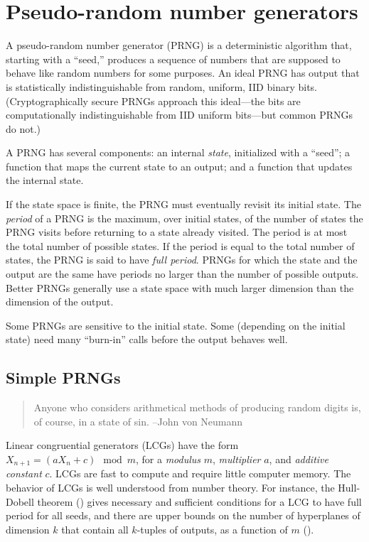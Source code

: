 \documentclass[graybox]{svmult}
\begin{document}
\section{Pseudo-random number generators}
\label{sec:prngs}

A pseudo-random number generator (PRNG) is a deterministic algorithm that, starting with
a ``seed,'' produces a sequence of numbers that are supposed to behave like random numbers
for some purposes.
An ideal PRNG has output that is statistically indistinguishable from random, uniform, IID 
binary bits. 
(Cryptographically secure PRNGs approach this ideal---the bits are computationally indistinguishable from IID uniform bits---but common PRNGs do not.)

A PRNG has several components:
an internal \emph{state}, initialized with a ``seed'';
a function that maps the current state to an output;
and a function that updates the internal state.

If the state space is finite, the PRNG must eventually revisit its initial state.
The \emph{period} of a PRNG is the maximum, over initial states, of the number of states 
the PRNG visits before returning to a state already visited.
The period is at most the total number of possible states.
If the period is equal to the total number of states, the PRNG is said to have \emph{full period}.
PRNGs for which the state and the output are the same have periods no larger than the number of possible outputs.
Better PRNGs generally use a state space with much larger dimension than the dimension of the output.

Some PRNGs are sensitive to the initial state.
Some (depending on the initial state) need many ``burn-in'' calls before the output 
behaves well.

\subsection{Simple PRNGs}

\begin{quotation}
Anyone who considers arithmetical methods of producing random digits is, of course, in a state of sin.  --John von Neumann
\end{quotation}


Linear congruential generators (LCGs) have the form $X_{n+1} = (a X_n + c) \mod m$, for a 
\emph{modulus} $m$, 
\emph{multiplier} $a$, and \emph{additive constant} $c$.
LCGs are fast to compute and require little computer memory.
The behavior of LCGs is well understood from number theory.
For instance, the Hull-Dobell theorem (\cite{hullDobell62})
gives necessary and sufficient conditions for a LCG to have full period for all seeds,
and there are upper bounds on the number of hyperplanes of dimension $k$
that contain all $k$-tuples of outputs, as a function of $m$ (\cite{marsaglia_random_1968}).
\end{document}
